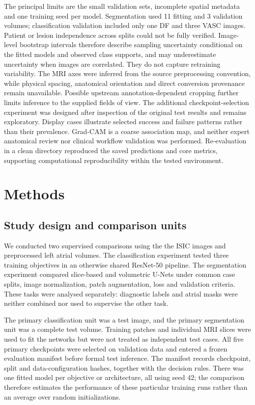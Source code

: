 \documentclass[11pt,a4paper]{article}
\begin{document}
The principal limits are the small validation sets, incomplete spatial metadata and one training seed per model. Segmentation used 11 fitting and 3 validation volumes; classification validation included only one DF and three VASC images. Patient or lesion independence across splits could not be fully verified. Image-level bootstrap intervals therefore describe sampling uncertainty conditional on the fitted models and observed class supports, and may underestimate uncertainty when images are correlated. They do not capture retraining variability. The MRI axes were inferred from the source preprocessing convention, while physical spacing, anatomical orientation and direct conversion provenance remain unavailable. Possible upstream annotation-dependent cropping further limits inference to the supplied fields of view. The additional checkpoint-selection experiment was designed after inspection of the original test results and remains exploratory. Display cases illustrate selected success and failure patterns rather than their prevalence. Grad-CAM is a coarse association map, and neither expert anatomical review nor clinical workflow validation was performed. Re-evaluation in a clean directory reproduced the saved predictions and core metrics, supporting computational reproducibility within the tested environment.



\clearpage

\section*{Methods}

\subsection*{Study design and comparison units}

We conducted two supervised comparisons using the the ISIC images and preprocessed left atrial volumes. The classification experiment tested three training objectives in an otherwise shared ResNet-50 pipeline. The segmentation experiment compared slice-based and volumetric U-Nets under common case splits, image normalization, patch augmentation, loss and validation criteria. These tasks were analysed separately: diagnostic labels and atrial masks were neither combined nor used to supervise the other task.



The primary classification unit was a test image, and the primary segmentation unit was a complete test volume. Training patches and individual MRI slices were used to fit the networks but were not treated as independent test cases. All five primary checkpoints were selected on validation data and entered a frozen evaluation manifest before formal test inference. The manifest records checkpoint, split and data-configuration hashes, together with the decision rules. There was one fitted model per objective or architecture, all using seed 42; the comparison therefore estimates the performance of these particular training runs rather than an average over random initializations.
\end{document}
